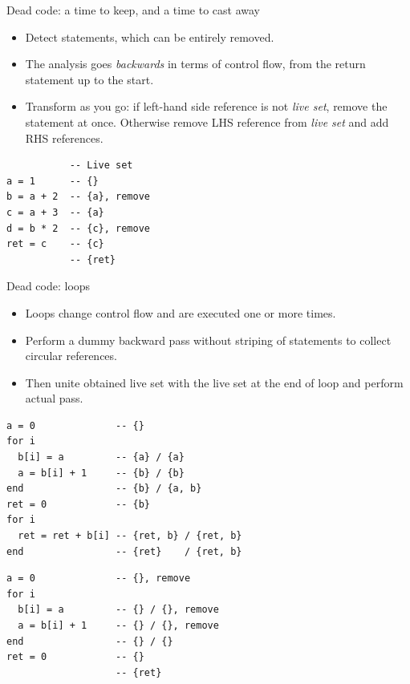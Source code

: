 \documentclass[handout]{beamer}
\begin{document}
\begin{frame}[fragile]{Dead code: a time to keep, and a time to cast away}

\begin{itemize}

\item Detect statements, which can be entirely removed.

\item The analysis goes {\em backwards} in terms of control flow, from the return statement up to the start.

\item Transform as you go: if left-hand side reference is not {\em live set}, remove the statement at once. Otherwise remove LHS reference from {\em live set} and add RHS references.

\end{itemize}

\begin{lstlisting}
           -- Live set
a = 1      -- {}
b = a + 2  -- {a}, remove
c = a + 3  -- {a}
d = b * 2  -- {c}, remove
ret = c    -- {c}
           -- {ret}
\end{lstlisting}

\end{frame}

\begin{frame}[fragile]{Dead code: loops}

\vspace{-1.5ex}

\begin{itemize}
\item Loops change control flow and are executed one or more times.
\item Perform a dummy backward pass without striping of statements to collect circular references.
\item Then unite obtained live set with the live set at the end of loop and perform actual pass.
\end{itemize}

\begin{lstlisting}
a = 0              -- {}
for i
  b[i] = a         -- {a} / {a}
  a = b[i] + 1     -- {b} / {b}
end                -- {b} / {a, b}
ret = 0            -- {b}
for i
  ret = ret + b[i] -- {ret, b} / {ret, b}
end                -- {ret}    / {ret, b}
\end{lstlisting}

\begin{lstlisting}
a = 0              -- {}, remove
for i
  b[i] = a         -- {} / {}, remove
  a = b[i] + 1     -- {} / {}, remove
end                -- {} / {}
ret = 0            -- {}
                   -- {ret}
\end{lstlisting}

\end{frame}
\end{document}
